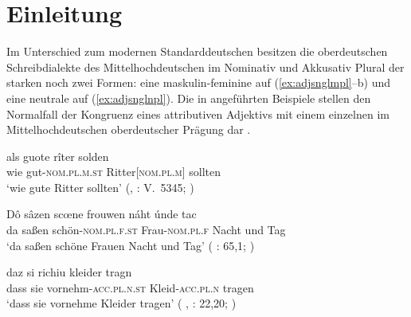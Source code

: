 \chapter{Einleitung}
\label{ch:einleitung}

Im Unterschied zum modernen Standarddeutschen besitzen die
oberdeutschen Schreib\-dialekte des
Mittelhochdeutschen im Nominativ und Akkusativ Plural der
starken  noch zwei Formen: eine maskulin-feminine auf
 (\ref{ex:adjsnglmpl}--b) und eine neutrale auf
 (\ref{ex:adjsnglnpl}). Die in  angeführten
Beispiele stellen den Normalfall der Kongruenz eines attributiven
Adjektivs mit einem einzelnen  im
Mittelhochdeutschen oberdeutscher Prägung
dar \autocites[vgl.][181--184]{ksw2}[200--203]{paul2007}.

\begin{exe}
\ex \label{ex:adjsngl}
	\begin{xlist}
	\ex \label{ex:adjsnglmpl}
		\gll als guote rîter solden \\
			wie gut-\textsc{nom.pl.m.st} Ritter[\textsc{nom.pl.m}] sollten \\
	\trans `wie gute Ritter sollten'
		(, : V.~5345;
			\cite[606]{mertens2004}%
		)

	\ex \label{ex:adjsnglfpl}
		\gll Dô sâzen scœne frouwen náht únde tac \\
			da saßen schön-\textsc{nom.pl.f.st} Frau-\textsc{nom.pl.f} Nacht 
			und	Tag \\
	\trans `da saßen schöne Frauen Nacht und Tag'
		(%
			: 65,1;
			\cite[16]{deboor1988}%
		)

	\ex \label{ex:adjsnglnpl}
		\gll daz si richiu kleider tragn \\
			dass sie vornehm-\textsc{acc.pl.n.st} Kleid-\textsc{acc.pl.n}
			tragen \\
		\trans `dass sie vornehme Kleider tragen'
			(%
				, : 22,20;
				\cite[24]{knechtschirok2003}%
			)
\end{xlist}
\end{exe}

